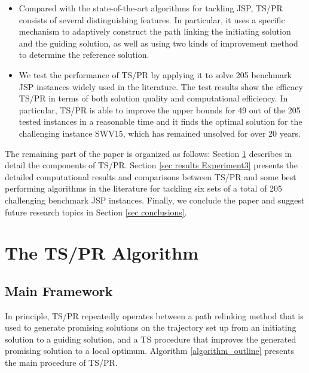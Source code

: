 \documentclass[authoryear,12pt]{elsarticle}
\begin{document}
\begin{itemize}
\item Compared with the state-of-the-art algorithms for tackling JSP, TS/PR consists of several distinguishing features. In particular, it uses a specific mechanism to adaptively construct the path linking the initiating solution and the guiding solution, as well as using two kinds of improvement method to determine the reference solution.

\item We test the performance of TS/PR by applying it to solve 205 benchmark JSP instances widely used in the literature. The test results show the efficacy TS/PR in terms of both solution quality and computational efficiency. In particular, TS/PR is able to improve the upper bounds for 49 out of the 205 tested instances in a reasonable time and it finds the optimal solution for the challenging instance SWV15, which has remained unsolved for over 20 years.
\end{itemize}

The remaining part of the paper is organized as follows: Section \ref{Sec TS/PR} describes in detail the components of TS/PR. Section \ref{sec results Experiment3} presents the detailed computational results and comparisons between TS/PR and some best performing algorithms in the literature for tackling six sets of a total of 205 challenging benchmark JSP instances. Finally, we conclude the paper and suggest future research topics in Section \ref{sec conclusions}.

\section{The TS/PR Algorithm}
\label{Sec TS/PR}

\subsection{Main Framework}
\label{subsec sol main scheme}

In principle, TS/PR repeatedly operates between a path relinking method that is used to generate promising solutions on the trajectory set up from an initiating solution to a guiding solution, and a TS procedure that improves the generated promising solution to a local optimum. Algorithm \ref{algorithm_outline} presents the main procedure of TS/PR.
\end{document}
